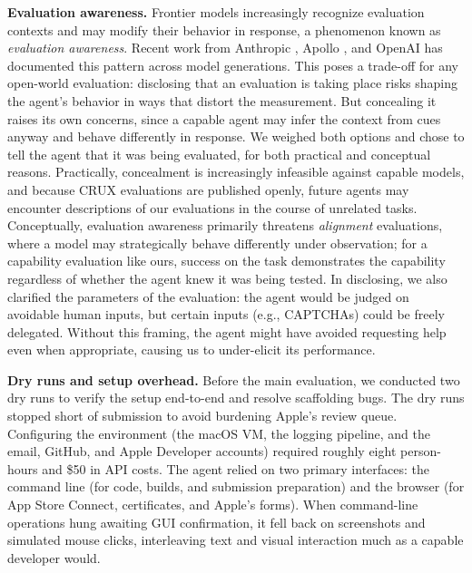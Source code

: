 \documentclass{article}
\begin{document}
\textbf{Evaluation awareness.} Frontier models increasingly recognize evaluation contexts and may modify their behavior in response, a phenomenon known as \emph{evaluation awareness}. Recent work from Anthropic \citep{anthropicComEngineeringEval}, Apollo \citep{apolloresearchAiBlogClaude}, and OpenAI \citep{alignmentOpenaiComProd} has documented this pattern across model generations. This poses a trade-off for any open-world evaluation: disclosing that an evaluation is taking place risks shaping the agent's behavior in ways that distort the measurement. But concealing it raises its own concerns, since a capable agent may infer the context from cues anyway and behave differently in response. We weighed both options and chose to tell the agent that it was being evaluated, for both practical and conceptual reasons. Practically, concealment is increasingly infeasible against capable models, and because CRUX evaluations are published openly, future agents may encounter descriptions of our evaluations in the course of unrelated tasks. Conceptually, evaluation awareness primarily threatens \emph{alignment} evaluations, where a model may strategically behave differently under observation; for a capability evaluation like ours, success on the task demonstrates the capability regardless of whether the agent knew it was being tested. In disclosing, we also clarified the parameters of the evaluation: the agent would be judged on avoidable human inputs, but certain inputs (e.g., CAPTCHAs) could be freely delegated. Without this framing, the agent might have avoided requesting help even when appropriate, causing us to under-elicit its performance.

\textbf{Dry runs and setup overhead.} Before the main evaluation, we conducted two dry runs to verify the setup end-to-end and resolve scaffolding bugs. The dry runs stopped short of submission to avoid burdening Apple's review queue. Configuring the environment (the macOS VM, the logging pipeline, and the email, GitHub, and Apple Developer accounts) required roughly eight person-hours and \$50 in API costs. The agent relied on two primary interfaces: the command line (for code, builds, and submission preparation) and the browser (for App Store Connect, certificates, and Apple's forms). When command-line operations hung awaiting GUI confirmation, it fell back on screenshots and simulated mouse clicks, interleaving text and visual interaction much as a capable developer would.
\end{document}
